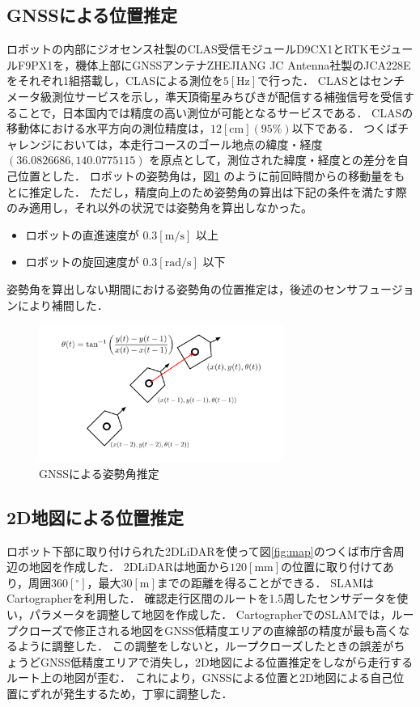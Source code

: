 \documentclass[platex,dvipdfmx]{rbproceedings}
\begin{document}
\subsection{GNSSによる位置推定}\label{ss:gnss_localization}
ロボットの内部にジオセンス社製のCLAS受信モジュールD9CX1とRTKモジュールF9PX1を，機体上部にGNSSアンテナZHEJIANG JC Antenna社製のJCA228Eをそれぞれ1組搭載し，CLASによる測位を$5 [ \mathrm{Hz} ]$で行った．
CLASとはセンチメータ級測位サービスを示し，準天頂衛星みちびきが配信する補強信号を受信することで，日本国内では精度の高い測位が可能となるサービスである．
CLASの移動体における水平方向の測位精度は，$12[\mathrm{cm}] (95 \%)$以下である．
つくばチャレンジにおいては，本走行コースのゴール地点の緯度・経度 $(36.0826686 ,140.0775115)$ を原点として，測位された緯度・経度との差分を自己位置とした．
ロボットの姿勢角は，図\ref{fig:gnss_orientaiton} のように前回時間からの移動量をもとに推定した．
ただし，精度向上のため姿勢角の算出は下記の条件を満たす際のみ適用し，それ以外の状況では姿勢角を算出しなかった。
\begin{itemize}
    \item ロボットの直進速度が $0.3[\mathrm{m/s}]$ 以上
    \item ロボットの旋回速度が $0.3[\mathrm{rad/s}]$ 以下
\end{itemize}
姿勢角を算出しない期間における姿勢角の位置推定は，後述のセンサフュージョンにより補間した．



\begin{figure}[htbp]
    \centering   
    \includegraphics[keepaspectratio,width=80mm]{fig/gnss_orientation.png}
    \caption{GNSSによる姿勢角推定}
    \label{fig:gnss_orientaiton}
\end{figure}

\subsection{2D地図による位置推定}\label{ss:map_localization}
ロボット下部に取り付けられた2DLiDARを使って図\ref{fig:map}のつくば市庁舎周辺の地図を作成した．
2DLiDARは地面から$120 [ \mathrm{mm}]$の位置に取り付けてあり，周囲$360[ ^\circ ]$，最大$30[ \mathrm{m}]$までの距離を得ることができる．
SLAMはCartographer\cite{cartographer}を利用した．
確認走行区間のルートを1.5周したセンサデータを使い，パラメータを調整して地図を作成した．
CartographerでのSLAMでは，ループクローズで修正される地図をGNSS低精度エリアの直線部の精度が最も高くなるように調整した．
この調整をしないと，ループクローズしたときの誤差がちょうどGNSS低精度エリアで消失し，2D地図による位置推定をしながら走行するルート上の地図が歪む．
これにより，GNSSによる位置と2D地図による自己位置にずれが発生するため，丁寧に調整した．
\end{document}
